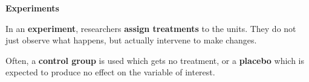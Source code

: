 \def\theTopic{Readings 3}

\begin{center}
{\bf {\large Experiments}}
\end{center}


In an {\bf experiment}, researchers {\bf assign treatments} to the
units.  They do not just observe what happens, but actually intervene
to make changes.

Often, a {\bf control group} is used which gets no treatment, or a
{\bf placebo} which is expected to produce no effect on the variable
of interest.

